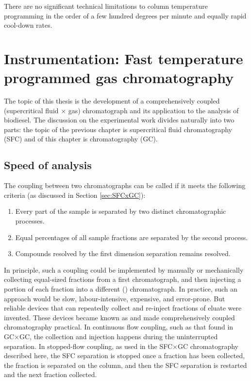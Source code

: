 
\begin{savequote}[\quotewidth] There are no significant technical limitations to column
temperature programming in the order of a few hundred degrees per minute and
equally rapid cool-down rates.
\end{savequote}

\chapter[Instrumentation: Fast GC]{Instrumentation: Fast temperature programmed gas chromatography} %

\label{Chapter5} %

The topic of this thesis is the development of a comprehensively coupled
(supercritical fluid × gas) chromatograph and its application to the analysis of
biodiesel. The discussion on the experimental work divides naturally into two
parts: the topic of the previous chapter is supercritical fluid chromatography
(SFC) and of this chapter is chromatography (GC).

\section{Speed of analysis}

The coupling between two chromatographs can be called  if
it meets the following criteria (as discussed in Section \ref{sec:SFCxGC}):
\begin{enumerate}
  \item Every part of the sample is separated by two distinct chromatographic processes.
  \item Equal percentages of all sample fractions are separated by the second process.	 
  \item Compounds resolved by the first dimension separation remains resolved.  
\end{enumerate} 

In principle, such a coupling could be implemented by manually or mechanically
collecting equal-sized fractions from a first \oneD chromatograph, and then
injecting a portion of each fraction into a different (\twoD) chromatograph. In
practice, such an approach would be slow, labour-intensive, expensive, and
error-prone. But reliable devices that can repeatedly collect and re-inject
fractions of eluate were invented. These devices became known as
 and made comprehensively coupled chromatography practical.
In continuous flow coupling, such as that found in GC×GC, the collection and
injection happens during the uninterrupted \oneD separation. In stopped-flow
coupling, as used in the SFC×GC chromatography described here, the \oneD SFC
separation is stopped once a fraction has been collected, the fraction is
separated on the \twoD column, and then the SFC separation is restarted and the
next fraction collected.


